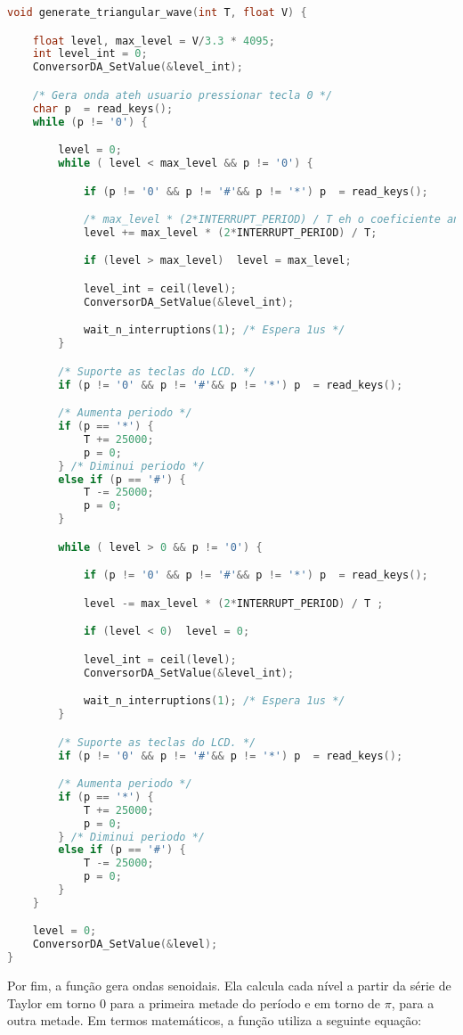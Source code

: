 \begin{lstlisting}[caption= Função de geração de ondas triangulares.
,language=C, numbers=none] 
void generate_triangular_wave(int T, float V) {

	float level, max_level = V/3.3 * 4095;
	int level_int = 0;
	ConversorDA_SetValue(&level_int);

	/* Gera onda ateh usuario pressionar tecla 0 */
	char p  = read_keys();
	while (p != '0') {

		level = 0;
		while ( level < max_level && p != '0') {

			if (p != '0' && p != '#'&& p != '*') p  = read_keys();

			/* max_level * (2*INTERRUPT_PERIOD) / T eh o coeficiente angular */
			level += max_level * (2*INTERRUPT_PERIOD) / T;

			if (level > max_level)	level = max_level;

			level_int = ceil(level);
			ConversorDA_SetValue(&level_int);

			wait_n_interruptions(1); /* Espera 1us */
		}

		/* Suporte as teclas do LCD. */
		if (p != '0' && p != '#'&& p != '*') p  = read_keys();

		/* Aumenta periodo */
		if (p == '*') {
			T += 25000;
			p = 0;
		} /* Diminui periodo */
		else if (p == '#') {
			T -= 25000;
			p = 0;
		}

		while ( level > 0 && p != '0') {

			if (p != '0' && p != '#'&& p != '*') p  = read_keys();

			level -= max_level * (2*INTERRUPT_PERIOD) / T ;

			if (level < 0)	level = 0;

			level_int = ceil(level);
			ConversorDA_SetValue(&level_int);

			wait_n_interruptions(1); /* Espera 1us */
		}

		/* Suporte as teclas do LCD. */
		if (p != '0' && p != '#'&& p != '*') p  = read_keys();

		/* Aumenta periodo */
		if (p == '*') {
			T += 25000;
			p = 0;
		} /* Diminui periodo */
		else if (p == '#') {
			T -= 25000;
			p = 0;
		}
	}

	level = 0;
	ConversorDA_SetValue(&level);
}
\end{lstlisting}

\vspace{12pt}

Por fim, a função  gera ondas senoidais. Ela
calcula cada nível a partir da série de Taylor em torno 0 para a primeira metade
do período e em torno de \(\pi\), para a outra metade. Em termos matemáticos, a
função utiliza a seguinte equação:

